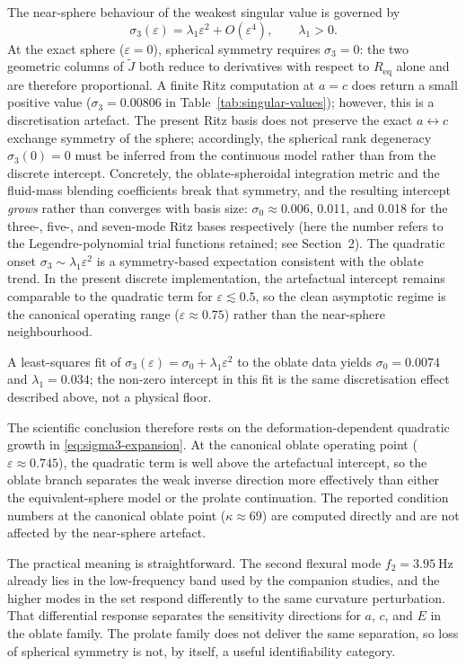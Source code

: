 The near-sphere behaviour of the weakest singular value is governed by
\begin{equation}
  \sigma_3(\varepsilon)
  =
  \lambda_1 \varepsilon^2 + O(\varepsilon^4),
  \qquad \lambda_1>0.
  \label{eq:sigma3-expansion}
\end{equation}
At the exact sphere ($\varepsilon=0$), spherical symmetry requires
$\sigma_3=0$: the two geometric columns of $\widetilde{J}$ both reduce to
derivatives with respect to $R_\mathrm{eq}$ alone and are therefore
proportional.  A finite Ritz computation at $a=c$ does return a small positive
value ($\sigma_3=\num{0.00806}$ in Table~\ref{tab:singular-values}); however,
this is a discretisation artefact.  The present Ritz basis does not preserve the
exact $a\leftrightarrow c$ exchange symmetry of the sphere; accordingly, the
spherical rank degeneracy $\sigma_3(0)=0$ must be inferred from the continuous
model rather than from the discrete intercept.  Concretely, the
oblate-spheroidal integration metric and the fluid-mass blending coefficients
break that symmetry, and the resulting intercept \emph{grows} rather than
converges with basis size: $\sigma_0\approx\num{0.006}$, \num{0.011}, and
\num{0.018} for the three-, five-, and seven-mode Ritz bases respectively (here
the number refers to the Legendre-polynomial trial functions retained; see
Section~2).  The quadratic onset $\sigma_3\sim\lambda_1\varepsilon^2$ is a
symmetry-based expectation consistent with the oblate trend.  In the present
discrete implementation, the artefactual intercept remains comparable to the
quadratic term for $\varepsilon\lesssim\num{0.5}$, so the clean asymptotic
regime is the canonical operating range ($\varepsilon\approx\num{0.75}$) rather
than the near-sphere neighbourhood.

A least-squares fit of $\sigma_3(\varepsilon)=\sigma_0+\lambda_1\varepsilon^2$ to the
oblate data yields $\sigma_0=\num{0.0074}$ and $\lambda_1=\num{0.034}$; the
non-zero intercept in this fit is the same discretisation effect described
above, not a physical floor.

The scientific conclusion therefore rests on the deformation-dependent quadratic
growth in \eqref{eq:sigma3-expansion}.  At the canonical oblate operating point
($\varepsilon\approx\num{0.745}$), the quadratic term is well above the
artefactual intercept, so the oblate branch separates the weak inverse direction
more effectively than either the equivalent-sphere model or the prolate
continuation.  The reported condition numbers at the canonical oblate point
($\kappa\approx 69$) are computed directly and are not affected by the
near-sphere artefact.

The practical meaning is straightforward.  The second flexural mode
$f_2=\SI{3.95}{\hertz}$ already lies in the low-frequency band used by the
companion studies, and the higher modes in the set respond differently to the
same curvature perturbation.  That differential response separates the
sensitivity directions for $a$, $c$, and $E$ in the oblate family.  The
prolate family does not deliver the same separation, so loss of spherical
symmetry is not, by itself, a useful identifiability category.
